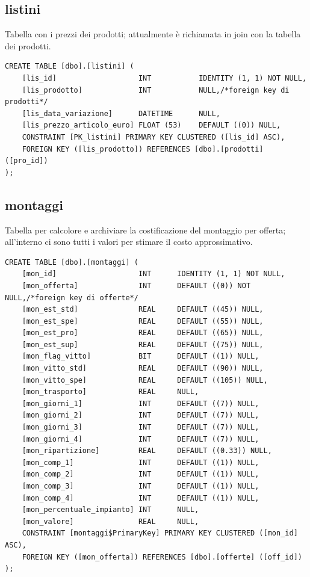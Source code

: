 \documentclass[12pt]{article}
\begin{document}
\subsection{listini}
Tabella con i prezzi dei prodotti; attualmente è richiamata in join con la tabella dei prodotti.
\begin{lstlisting}
CREATE TABLE [dbo].[listini] (
    [lis_id]                   INT           IDENTITY (1, 1) NOT NULL,
    [lis_prodotto]             INT           NULL,/*foreign key di prodotti*/
    [lis_data_variazione]      DATETIME      NULL,
    [lis_prezzo_articolo_euro] FLOAT (53)    DEFAULT ((0)) NULL,
    CONSTRAINT [PK_listini] PRIMARY KEY CLUSTERED ([lis_id] ASC),
    FOREIGN KEY ([lis_prodotto]) REFERENCES [dbo].[prodotti] ([pro_id])
);
\end{lstlisting}

\subsection{montaggi}
Tabella per calcolore  e archiviare la costificazione del montaggio per offerta; all'interno ci sono tutti i valori per stimare il costo approssimativo.
\begin{lstlisting}
CREATE TABLE [dbo].[montaggi] (
    [mon_id]                   INT      IDENTITY (1, 1) NOT NULL,
    [mon_offerta]              INT      DEFAULT ((0)) NOT NULL,/*foreign key di offerte*/
    [mon_est_std]              REAL     DEFAULT ((45)) NULL,
    [mon_est_spe]              REAL     DEFAULT ((55)) NULL,
    [mon_est_pro]              REAL     DEFAULT ((65)) NULL,
    [mon_est_sup]              REAL     DEFAULT ((75)) NULL,
    [mon_flag_vitto]           BIT      DEFAULT ((1)) NULL,
    [mon_vitto_std]            REAL     DEFAULT ((90)) NULL,
    [mon_vitto_spe]            REAL     DEFAULT ((105)) NULL,
    [mon_trasporto]            REAL     NULL,
    [mon_giorni_1]             INT      DEFAULT ((7)) NULL,
    [mon_giorni_2]             INT      DEFAULT ((7)) NULL,
    [mon_giorni_3]             INT      DEFAULT ((7)) NULL,
    [mon_giorni_4]             INT      DEFAULT ((7)) NULL,
    [mon_ripartizione]         REAL     DEFAULT ((0.33)) NULL,
    [mon_comp_1]               INT      DEFAULT ((1)) NULL,
    [mon_comp_2]               INT      DEFAULT ((1)) NULL,
    [mon_comp_3]               INT      DEFAULT ((1)) NULL,
    [mon_comp_4]               INT      DEFAULT ((1)) NULL,
    [mon_percentuale_impianto] INT      NULL,
    [mon_valore]               REAL     NULL,
    CONSTRAINT [montaggi$PrimaryKey] PRIMARY KEY CLUSTERED ([mon_id] ASC),
    FOREIGN KEY ([mon_offerta]) REFERENCES [dbo].[offerte] ([off_id])
);
\end{lstlisting}
\end{document}
